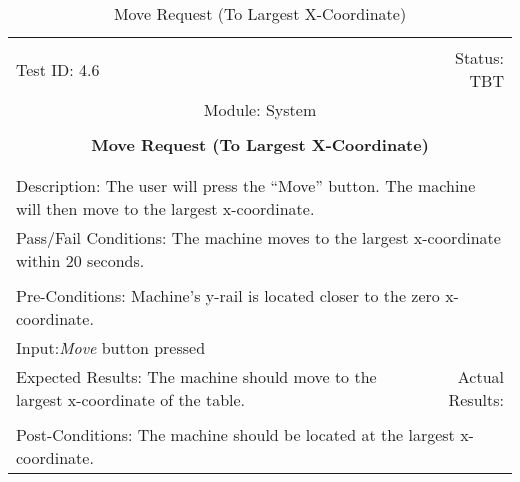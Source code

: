 \documentclass[titlepage]{article}
\begin{document}
\begin{center}%
\begin{table}[h!]
\begin{tabular}{|l r|}\hline&\\[-2mm]
	Test ID: 4.6	&Status: TBT\\[-3mm]
	\multicolumn{2}{|c|}{Module: System}\\&\\
	\multicolumn{2}{|c|}{\textbf{\large{Move Request (To Largest X-Coordinate)}}}\\&\\\hline&\\[-3mm]
	\multicolumn{2}{|p{\textwidth}|}{Description: The user will press the ``Move'' button. The machine will then move to the largest x-coordinate.}\\\hline
	\multicolumn{2}{|p{\textwidth}|}{Pass/Fail Conditions: The machine moves to the largest x-coordinate within 20 seconds.}\\[1mm]\hline&\\[-3mm]
	\multicolumn{2}{|p{\textwidth}|}{Pre-Conditions: Machine's y-rail is located closer to the zero x-coordinate.}\\[4mm]
	\multicolumn{2}{|p{\textwidth}|}{Input:\newline\textit{Move} button pressed}\\[2mm]\hline
	\multicolumn{1}{|p{0.49\textwidth}}{Expected Results: The machine should move to the largest x-coordinate of the table.}	&\multicolumn{1}{|p{0.45\textwidth}|}{Actual Results: }\\\hline&\\[-3mm]
	\multicolumn{2}{|p{\textwidth}|}{Post-Conditions: The machine should be located at the largest x-coordinate.}\\\hline
\end{tabular}
\caption{Move Request (To Largest X-Coordinate)}
\end{table}
\end{center}
\newpage
\end{document}
